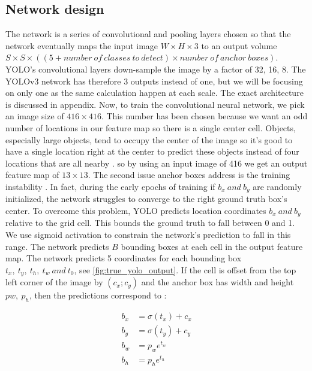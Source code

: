 \subsection{Network design}\label{sub:net_design}\label{sec:network}

The network is a series of convolutional and pooling layers chosen so that the network eventually maps the input image $W \times H \times 3$ to
an output volume $S \times S \times ((5 + number\ of\ classes\ to\ detect) \times number\ of\ anchor\ boxes)$. YOLO's convolutional layers down-sample the image by a factor of 32, 16, 8. The YOLOv3 network has therefore 3 outputs instead of one, but we will be focusing on only one as the same calculation happen at each scale. The exact architecture is discussed in appendix.
Now, to train the convolutional neural network, we pick an image size of $416 \times 416$.
This number has been chosen because we want an odd number of
locations in our feature map so there is a single center cell.
Objects, especially large objects, tend to occupy the center
of the image so it’s good to have a single location right at
the center to predict these objects instead of four locations
that are all nearby \cite{YOLOv2}.
so by using an input image of 416 we get an output feature map of $13 \times 13$.
The second issue anchor boxes address is the training instability \cite{YOLOv2}. In fact, during the early epochs of training if $b_{x}\ and\ b_{y}$ are randomly initialized, the network
struggles to converge to the right ground truth box's center. To overcome this problem, YOLO predicts location coordinates $b_{x}\ and\ b_{y}$ relative to the grid
cell. This bounds the ground truth to fall between 0 and 1. We use sigmoid activation to constrain the network's prediction to fall in this range.
The network predicts $B$ bounding boxes at each cell in the output feature map. The network predicts 5 coordinates for each bounding box $t_{x},\ t_{y},\ t_{h},\ t_{w}\ and\ t_{0}$, see \cref{fig:true_yolo_output}. If the cell is
offset from the top left corner of the image by $(c_{x}; c_{y})$ and
the anchor box has width and height $p{w},\ p_{h}$, then
the predictions correspond to \cite{YOLOv2}:

\begin{align}
  \label{bbox}
  b_{x} &= \sigma(t_{x}) + c_x \\
  b_{y} &= \sigma(t_{y}) + c_y \\
  b_{w} &= p_{w}e^{t_{w}} \\
  b_{h} &= p_{h}e^{t_{h}}
\end{align}

